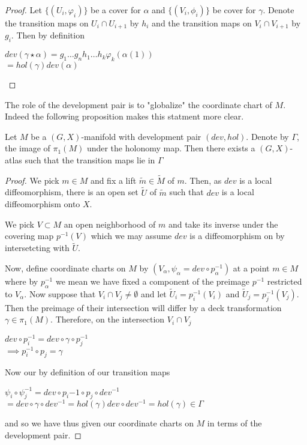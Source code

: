 \begin{proof}
    Let $\{(U_i, \varphi_i)\}$ be a cover for $\alpha$ and $\{(V_i, \phi_i)\}$ be
    cover for $\gamma$. Denote the transition maps on $U_i \cap U_{i+1}$ by $h_i$
    and the transition maps on $V_i \cap V_{i+1}$ by $g_i$. Then by definition
    \begin{center}
        $dev(\gamma \star \alpha) = g_1 \dots g_n h_1 \dots h_k \varphi_k(\alpha(1))$\\
        $= hol(\gamma)dev(\alpha)$
    \end{center}
\end{proof}

The role of the development pair is to "globalize" the coordinate chart of $M$.
Indeed the following proposition makes this statment more clear.

\begin{prop}
    Let $M$ be a $(G,X)$-manifold with development pair $(dev, hol)$. Denote
    by $\Gamma$, the image of $\pi_1(M)$ under the holonomy map. Then there
    exists a $(G,X)$-atlas such that the transition maps lie in $\Gamma$
\end{prop}

\begin{proof}
    \label{prop:dev-charts}
    We pick $m\in M$ and fix a lift $\tilde{m}\in \tilde{M}$ of $m$. Then, as
    $dev$ is a local diffeomorphism, there is an open set $\tilde{U}$ of $\tilde{m}$
    such that $dev$ is a local diffeomorphism onto $X$.

    We pick $V \subset M$ an open neighborhood of $m$ and take its inverse under
    the covering map $p^{-1}(V)$ which we may assume $dev$ is a diffeomorphism on
    by intersetcting with $\tilde{U}$.

    Now, define coordinate charts on $M$ by $(V_{\alpha}, \psi_{\alpha} = dev \circ
        p^{-1}_{\alpha})$ at a point $m \in M$ where by $p^{-1}_{\alpha}$ we mean we
    have fixed a component of the preimage $p^{-1}$ restricted to $V_{\alpha}$. Now
    suppose that $V_i \cap V_j \neq \emptyset$ and let $\tilde{U}_i =
        p_i^{-1}(V_i)$ and $\tilde{U}_j = p_j^{-1}(V_j)$. Then the preimage of their
    intersection will differ by a deck transformation $\gamma \in \pi_1(M)$.
    Therefore, on the intersection $V_i \cap V_j$
    \begin{center}
        $dev \circ p_i^{-1} = dev \circ \gamma \circ p_j^{-1}$\\
        $\implies p^{-1}_i \circ p_j = \gamma$
    \end{center}

    Now our by definition of our transition maps
    \begin{center}
        $\psi_i \circ \psi_j^{-1} = dev \circ p_i{-1} \circ p_j \circ dev^{-1}$\\
        $= dev \circ \gamma \circ dev^{-1} = hol(\gamma)dev\circ dev^{-1} = hol(\gamma) \in \Gamma$
    \end{center}

    and so we have thus given our coordinate charts on $M$ in terms of the
    development pair.
\end{proof}

